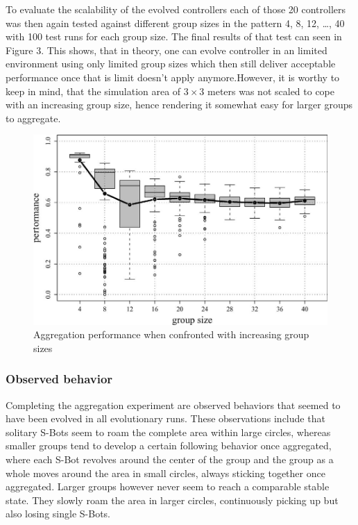 To evaluate the scalability of the evolved controllers each of those 20
controllers was then again tested against different group sizes in the pattern
4, 8, 12, \dots, 40 with 100 test runs for each group size. The final results of
that test can seen in Figure 3. This shows, that in theory, one can evolve
controller in an limited environment using only limited group sizes which
then still deliver acceptable performance once that is limit doesn't apply
anymore.However, it is worthy to keep in mind, that the simulation area of
$3\times 3$ meters was not scaled to cope with an increasing group size, hence
rendering it somewhat easy for larger groups to aggregate.
\ \\

\begin{figure}[h!]
  \centering
    \includegraphics[width=0.8\linewidth]{pics/06.png}
  \caption{Aggregation performance when confronted with increasing group sizes}
  \label{}
\end{figure}

\subsubsection{Observed behavior}
Completing the aggregation experiment are observed behaviors that seemed to
have been evolved in all evolutionary runs. These observations include that
solitary S-Bots seem to roam the complete area within large circles, whereas
smaller groups tend to develop a certain following behavior once aggregated,
where each S-Bot revolves around the center of the group and the group as a
whole moves around the area in small circles, always sticking together once
aggregated. Larger groups however never seem to reach a comparable stable
state. They slowly roam the area in larger circles, continuously picking up
but also losing single S-Bots.

